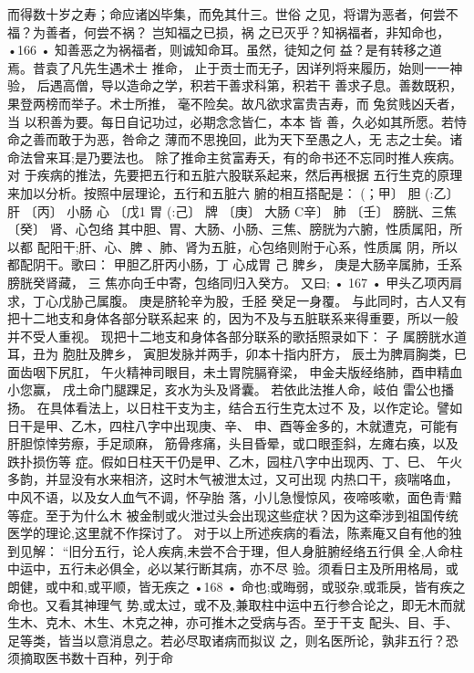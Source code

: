 而得数十岁之寿；命应诸凶毕集，而免其什三。世俗
之见，将谓为恶者，何尝不福？为善者，何尝不祸？
岂知福之已损，祸 之已灭乎？知祸福者，非知命也，
•166 •
知善恶之为祸福者，则诚知命耳。虽然，徒知之何
益？是有转移之道焉。昔袁了凡先生遇术士 推命，
止于贡士而无子，因详列将来履历，始则一一神验，
后遇高僧，导以造命之学，积若干善求科第，积若干
善求子息。善数既积，果登两榜而举子。术士所推，
毫不险矣。故凡欲求富贵吉寿，而 兔贫贱凶夭者，当
以积善为要。每日自记功过，必期念念皆仁，本本 皆
善，久必如其所愿。若恃命之善而敢于为恶，咎命之
薄而不思挽回，此为天下至愚之人，无 志之士矣。诸
命法曾来耳;是乃要法也。
除了推命主贫富寿夭，有的命书还不忘同时推人疾病。对
于疾病的推法，先要把五行和五脏六股联系起来，然后再根据
五行生克的原理来加以分析。按照中层理论，五行和五脏六
腑的相互搭配是：
(；甲〕 胆 (:乙〕肝
〔丙〕 小肠 心
〔戊1 胃 (:己〕 牌
〔庚〕 大肠 C辛〕 肺
〔壬〕 膀胱、三焦 〔癸〕 肾、心包络
其中胆、胃、大肠、小肠、三焦、膀胱为六腑，性质属阳，所以都
配阳干;肝、心、脾 、肺、肾为五脏，心包络则附于心系，性质属
阴，所以都配阴干。歌曰：
甲胆乙肝丙小肠，丁 心成胃 己 脾乡，
庚是大肠辛属肺，壬系 膀胱癸肾藏，
三 焦亦向壬中寄，包络同归入癸方。
又曰;
• 167 •
甲头乙项丙肩求，丁心戊胁己属腹。
庚是脐轮辛为股，壬胫 癸足一身覆。
与此同时，古人又有把十二地支和身体各部分联系起来
的，因为不及与五脏联系来得重要，所以一般并不受人重视。
现把十二地支和身体各部分联系的歌括照录如下：
子 属膀胱水道耳，丑为 胞肚及脾乡，
寅胆发脉并两手，卯本十指内肝方，
辰土为脾肩胸类，巳面齿咽下尻肛，
午火精神司眼目，未土胃院膈脊梁，
申金夫版经络肺，酉申精血小您赢，
戌土命门腿踝足，亥水为头及肾囊。
若依此法推人命，岐伯 雷公也播扬。
在具体看法上，以日柱干支为主，结合五行生克太过不
及，以作定论。譬如日干是甲、乙木，四柱八字中出现庚、辛、
申、酉等金多的，木就遭克，可能有肝胆惊悻劳瘵，手足顽麻，
筋骨疼痛，头目昏晕，或口眼歪斜，左瘫右痪，以及跌扑损伤等
症。假如日柱天干仍是甲、乙木，园柱八字中出现丙、丁、巳、
午火多韵，并显没有水来相济，这时木气被泄太过，又可出现
内热口干，痰喘咯血，中风不语，以及女人血气不调，怀孕胎
落，小儿急慢惊风，夜啼咳嗽，面色青‘黯等症。至于为什么木
被金制或火泄过头会出现这些症状？因为这牵涉到祖国传统
医学的理论,这里就不作探讨了。
对于以上所述疾病的看法，陈素庵又自有他的独到见解：
“旧分五行，论人疾病,未尝不合于理，但人身脏腑经络五行俱
全,人命柱中运中，五行未必俱全，必以某行断其病，亦不尽
验。须看日主及所用格局，或朗健，或中和,或平顺，皆无疾之
•168 •
命也;或晦弱，或驳杂,或乖戾，皆有疾之命也。又看其神理气
势,或太过，或不及,兼取柱中运中五行参合论之，即无木而就
生木、克木、木生、木克之神，亦可推木之受病与否。至于干支
配头、目、手、足等类，皆当以意消息之。若必尽取诸病而拟议
之，则名医所论，孰非五行？恐须摘取医书数十百种，列于命
